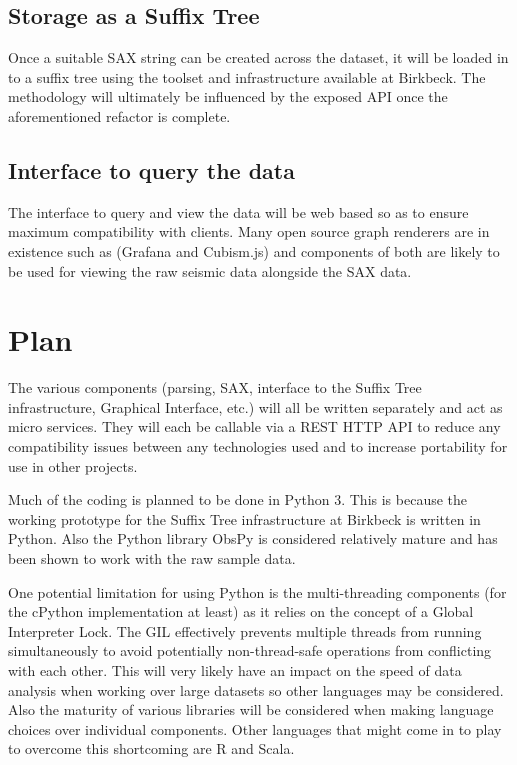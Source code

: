 \documentclass[11pt]{scrartcl}
\begin{document}
\subsection{Storage as a Suffix Tree}
	Once a suitable SAX string can be created across the dataset, it will be loaded in to a suffix tree using the toolset and infrastructure available at Birkbeck.  The methodology will ultimately be influenced by the exposed API once the aforementioned refactor is complete.

\subsection{Interface to query the data}
	The interface to query and view the data will be web based so as to ensure maximum compatibility with clients.  Many open source graph renderers are in existence such as (Grafana and Cubism.js) and components of both are likely to be used for viewing the raw seismic data alongside the SAX data.

\section{Plan}
	The various components (parsing, SAX, interface to the Suffix Tree infrastructure, Graphical Interface, etc.) will all be written separately and act as micro services.  They will each be callable via a REST HTTP API to reduce any compatibility issues between any technologies used and to increase portability for use in other projects.

	Much of the coding is planned to be done in Python 3.  This is because the working prototype for the Suffix Tree infrastructure at Birkbeck is written in Python.  Also the Python library ObsPy is considered relatively mature and has been shown to work with the raw sample data.
	
	One potential limitation for using Python is the multi-threading components (for the cPython implementation at least) as it relies on the concept of a Global Interpreter Lock.  The GIL effectively prevents multiple threads from running simultaneously to avoid potentially non-thread-safe operations from conflicting with each other.  This will very likely have an impact on the speed of data analysis when working over large datasets so other languages may be considered.  Also the maturity of various libraries will be considered when making language choices over individual components.  Other languages that might come in to play to overcome this shortcoming are R and Scala.
	
\end{document}

